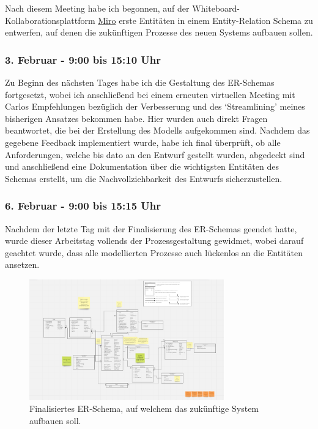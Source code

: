 Nach diesem Meeting habe ich begonnen, auf der Whiteboard-Kollaborationsplattform \href{https://miro.com/de/}{Miro} erste Entitäten in einem Entity-Relation Schema zu entwerfen, auf denen die zukünftigen Prozesse des neuen Systems aufbauen sollen.

\subsubsection*{3. Februar - 9:00 bis 15:10 Uhr}
Zu Beginn des nächsten Tages habe ich die Gestaltung des ER-Schemas fortgesetzt, wobei ich anschließend bei einem erneuten virtuellen Meeting mit Carlos Empfehlungen bezüglich der Verbesserung und des \enquote*{Streamlining} meines bisherigen Ansatzes bekommen habe. Hier wurden auch direkt Fragen beantwortet, die bei der Erstellung des Modells aufgekommen sind. Nachdem das gegebene Feedback implementiert wurde, habe ich final überprüft, ob alle Anforderungen, welche bis dato an den Entwurf gestellt wurden, abgedeckt sind und anschließend eine Dokumentation über die wichtigsten Entitäten des Schemas erstellt, um die Nachvollziehbarkeit des Entwurfs sicherzustellen. 

\subsubsection*{6. Februar - 9:00 bis 15:15 Uhr}
Nachdem der letzte Tag mit der Finalisierung des ER-Schemas geendet hatte, wurde dieser Arbeitstag vollends der Prozessgestaltung gewidmet, wobei darauf geachtet wurde, dass alle modellierten Prozesse auch lückenlos an die Entitäten ansetzen. 

\begin{figure}[h]
    \centering
    \includegraphics[width=0.75\textwidth]{img/miro_erschema.png}
    \caption{Finalisiertes ER-Schema, auf welchem das zukünftige System aufbauen soll.}
\end{figure}

